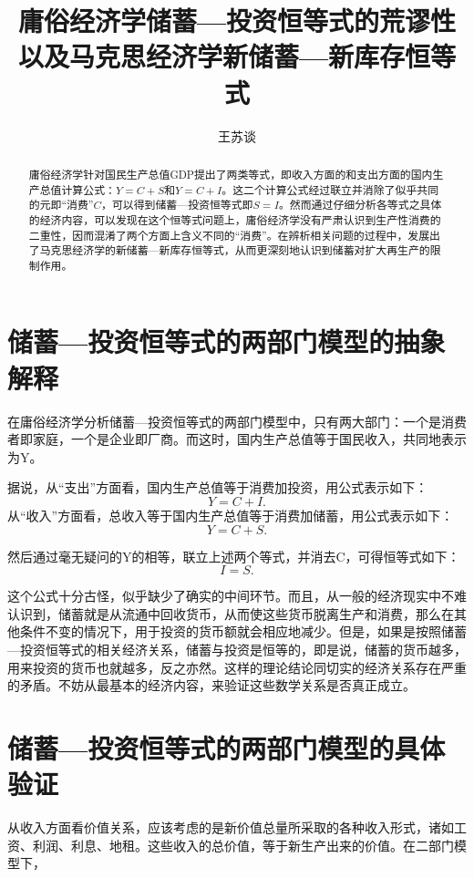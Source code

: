 \documentclass[a4paper]{ctexart}
\title{庸俗经济学储蓄—投资恒等式的荒谬性\newline 以及马克思经济学新储蓄—新库存恒等式}
\author{王苏谈}
\begin{document}
\maketitle
\tableofcontents

\begin{abstract}

庸俗经济学针对国民生产总值GDP提出了两类等式，即收入方面的和支出方面的国内生产总值计算公式：$Y = C + S$和$Y = C + I$。这二个计算公式经过联立并消除了似乎共同的元即“消费”$C$，可以得到储蓄—投资恒等式即$S = I$。然而通过仔细分析各等式之具体的经济内容，可以发现在这个恒等式问题上，庸俗经济学没有严肃认识到生产性消费的二重性，因而混淆了两个方面上含义不同的“消费”。在辨析相关问题的过程中，发展出了马克思经济学的新储蓄—新库存恒等式，从而更深刻地认识到储蓄对扩大再生产的限制作用。

\end{abstract}

\section{储蓄—投资恒等式的两部门模型的抽象解释}

在庸俗经济学分析储蓄—投资恒等式的两部门模型中，只有两大部门：一个是消费者即家庭，一个是企业即厂商。而这时，国内生产总值等于国民收入，共同地表示为Y。

据说，从“支出”方面看，国内生产总值等于消费加投资，用公式表示如下：$$Y = C + I.$$从“收入”方面看，总收入等于国内生产总值等于消费加储蓄，用公式表示如下：$$Y = C + S.$$

然后通过毫无疑问的Y的相等，联立上述两个等式，并消去C，可得恒等式如下：$$I = S.$$

这个公式十分古怪，似乎缺少了确实的中间环节。而且，从一般的经济现实中不难认识到，储蓄就是从流通中回收货币，从而使这些货币脱离生产和消费，那么在其他条件不变的情况下，用于投资的货币额就会相应地减少。但是，如果是按照储蓄—投资恒等式的相关经济关系，储蓄与投资是恒等的，即是说，储蓄的货币越多，用来投资的货币也就越多，反之亦然。这样的理论结论同切实的经济关系存在严重的矛盾。不妨从最基本的经济内容，来验证这些数学关系是否真正成立。

\section{储蓄—投资恒等式的两部门模型的具体验证}

从收入方面看价值关系，应该考虑的是新价值总量所采取的各种收入形式，诸如工资、利润、利息、地租。这些收入的总价值，等于新生产出来的价值。在二部门模型下，
\end{document}
